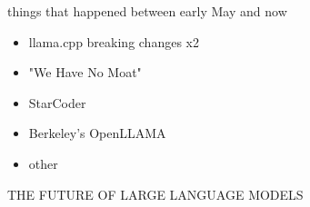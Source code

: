 \documentclass{beamer}
\begin{document}
\begin{frame}{things that happened between early May and now}
	\begin{itemize}
		\item llama.cpp breaking changes x2
		\pause
		\item "We Have No Moat"
		\pause
		\item StarCoder
		\pause
		\item Berkeley's OpenLLAMA
		\pause
		\item other
	\end{itemize}
\end{frame}

\begin{frame}{THE FUTURE OF LARGE LANGUAGE MODELS}
	
\end{frame}
\end{document}
